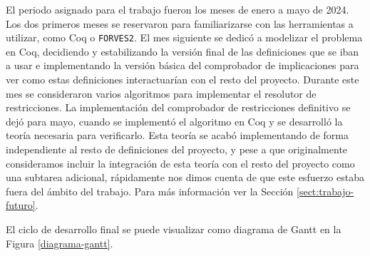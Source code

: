 El periodo asignado para el trabajo fueron los meses de enero a mayo de 2024. Los dos primeros
meses se reservaron para familiarizarse con las herramientas a utilizar, como Coq o \verb|FORVES2|.
El mes siguiente se dedicó a modelizar el problema en Coq, decidiendo y estabilizando la versión
final de las definiciones que se iban a usar e implementando la versión básica del comprobador de
implicaciones para ver como estas definiciones interactuarían con el resto del proyecto. Durante
este mes se consideraron varios algoritmos para implementar el resolutor de restricciones. La
implementación del comprobador de restricciones definitivo se dejó para mayo, cuando se implementó
el algoritmo en Coq y se desarrolló la teoría necesaria para verificarlo. Esta teoría se acabó
implementando de forma independiente al resto de definiciones del proyecto, y pese a que 
originalmente consideramos incluir la integración de esta teoría con el resto del proyecto como 
una subtarea adicional, rápidamente nos dimos cuenta de que este esfuerzo estaba fuera del ámbito
del trabajo. Para más información ver la Sección \ref{sect:trabajo-futuro}.

El ciclo de desarrollo final se puede visualizar como diagrama de Gantt en la Figura \ref{diagrama-gantt}.

